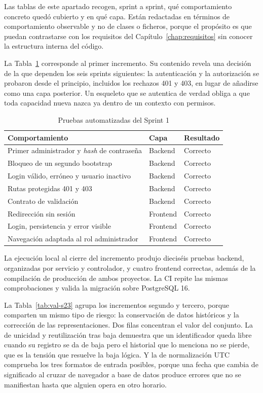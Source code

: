 Las tablas de este apartado recogen, sprint a sprint, qué comportamiento concreto quedó cubierto y en qué capa. Están redactadas en términos de comportamiento observable y no de clases o ficheros, porque el propósito es que puedan contrastarse con los requisitos del Capítulo~\ref{chap:requisitos} sin conocer la estructura interna del código.

La Tabla~\ref{tab:val-s1} corresponde al primer incremento. Su contenido revela una decisión de la que dependen los seis sprints siguientes: la autenticación y la autorización se probaron desde el principio, incluidos los rechazos 401 y 403, en lugar de añadirse como una capa posterior. Un esqueleto que se autentica de verdad obliga a que toda capacidad nueva nazca ya dentro de un contexto con permisos.

\begin{table}[htbp]
\centering
\caption{Pruebas automatizadas del Sprint 1}
\label{tab:val-s1}
\begin{tabular}{p{6.2cm}p{2cm}p{2.5cm}}
\hline Comportamiento & Capa & Resultado \\ \hline
Primer administrador y \emph{hash} de contraseña & Backend & Correcto \\
Bloqueo de un segundo bootstrap & Backend & Correcto \\
Login válido, erróneo y usuario inactivo & Backend & Correcto \\
Rutas protegidas 401 y 403 & Backend & Correcto \\
Contrato de validación & Backend & Correcto \\
Redirección sin sesión & Frontend & Correcto \\
Login, persistencia y error visible & Frontend & Correcto \\
Navegación adaptada al rol administrador & Frontend & Correcto \\
\hline
\end{tabular}
\end{table}

La ejecución local al cierre del incremento produjo dieciséis pruebas backend, organizadas por servicio y controlador, y cuatro frontend correctas, además de la compilación de producción de ambos proyectos. La CI repite las mismas comprobaciones y valida la migración sobre PostgreSQL 16.

\clearpage
La Tabla~\ref{tab:val-s23} agrupa los incrementos segundo y tercero, porque comparten un mismo tipo de riesgo: la conservación de datos históricos y la corrección de las representaciones. Dos filas concentran el valor del conjunto. La de unicidad y reutilización tras baja demuestra que un identificador queda libre cuando su registro se da de baja pero el historial que lo menciona no se pierde, que es la tensión que resuelve la baja lógica. Y la de normalización UTC comprueba los tres formatos de entrada posibles, porque una fecha que cambia de significado al cruzar de navegador a base de datos produce errores que no se manifiestan hasta que alguien opera en otro horario.

